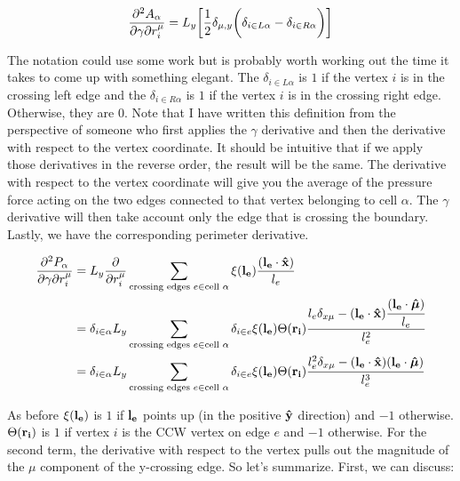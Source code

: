 \documentclass[12pt,a4paper]{article}
\begin{document}
\begin{align}
	\label{eqn: dadgammadr}
	\pdv{A_{\alpha}}{\gamma}{r_i^\mu} = L_y\bigg[\frac{1}{2}\delta_{\mu,y}\bigg(\delta_{i\in L\alpha} - \delta_{i\in R\alpha}\bigg) \bigg]
\end{align}

The notation could use some work but is probably worth working out the time it takes to come up with something elegant. The $\delta_{i \in L\alpha}$ is $1$ if the vertex $i$ is in the crossing left edge and the $\delta_{i \in R\alpha}$ is $1$ if the vertex $i$ is in the crossing right edge. Otherwise, they are $0$. Note that I have written this definition from the perspective of someone who first applies the $\gamma$ derivative and then the derivative with respect to the vertex coordinate. It should be intuitive that if we apply those derivatives in the reverse order, the result will be the same. The derivative with respect to the vertex coordinate will give you the average of the pressure force acting on the two edges connected to that vertex belonging to cell $\alpha$. The $\gamma$ derivative will then take account only the edge that is crossing the boundary.
Lastly, we have the corresponding perimeter derivative. 

\begin{align}
	\label{eqn: dPdgammadr}
	\pdv{P_\alpha}{\gamma}{r_i^\mu} &=  L_y\pdv{r_i^\mu}\sum\limits_{ \text{crossing edges } e \in \text{cell } \alpha} \xi(\vb{l_e})\frac{(\vb{l_e}\cdot \vu{x})}{l_e} \\
	&= \delta_{i \in \alpha} L_y \sum\limits_{ \text{crossing edges } e \in \text{cell } \alpha} \delta_{i\in e} \xi(\vb{l_e})  \Theta(\vb{r_i})\cfrac{ l_e\delta_{x \mu} - (\vb{l_e}\cdot \vu{x}) \cfrac{(\vb{l_e}\cdot \vu*{\mu})}{l_e}}{l_e^2}\\
	&= \delta_{i \in \alpha} L_y \sum\limits_{ \text{crossing edges } e \in \text{cell } \alpha} \delta_{i\in e} \xi(\vb{l_e}) \Theta(\vb{r_i})\cfrac{ l_e^2\delta_{x \mu}  - (\vb{l_e}\cdot \vu{x}) (\vb{l_e}\cdot \vu*{\mu})}{l_e^3}\\
\end{align}

As before $\xi(\vb{l_e})$ is $1$ if $\vb{l_e}$ points up (in the positive $\vu{y}$ direction) and $-1$ otherwise. $\Theta(\vb{r_i})$ is $1$ if vertex $i$ is the CCW vertex on edge $e$ and $-1$ otherwise. For the second term, the derivative with respect to the vertex pulls out the magnitude of the $\mu$ component of the y-crossing edge. 
So let's summarize. First, we can discuss:
\end{document}
